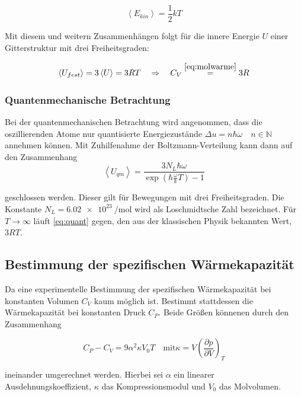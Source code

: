 \begin{equation*}
\left< E_{kin} \right>=\frac{1}{2}kT
\end{equation*} 

Mit diesem und weitern Zusammenhängen folgt für die innere Energie $U$ 
einer Gitterstruktur mit drei Freiheitsgraden:

\begin{equation*}
\left< U_{fest} \right> = 3 \left< U \right>=3RT \quad \Rightarrow \quad C_{V}\overset{\eqref{eq:molwarme}}{=}3R
\end{equation*}

\subsubsection{Quantenmechanische Betrachtung}
Bei der quantenmechanischen Betrachtung wird angenommen, 
dass die oszillierenden Atome nur quantisierte Energiezustände $\Delta u=n\hbar \omega \quad n\in\mathbb{N}$
annehmen können.
Mit Zuhilfenahme der Boltzmann-Verteilung kann dann auf den Zusammenhang 
\begin{equation}
\label{eq:quant}
\left< U_{qm} \right> =\frac{3N_L \hbar \omega}{\exp\left(\hbar \frac{\omega}{k} T\right) -1}
\end{equation}

geschlossen werden. Dieser gilt für Bewegungen mit drei Freiheitsgraden.
Die Konstante $N_L = \SI{6.02e23}{\per\mol}$ wird als Loschmidtsche Zahl bezeichnet.
Für $T\to\infty$ läuft \eqref{eq:quant} gegen, den aus der klassischen Physik bekannten Wert, 
$3RT$.

\subsection{Bestimmung der spezifischen Wärmekapazität}
Da eine experimentelle Bestimmung der spezifischen Wärmekapazität 
bei konstanten Volumen $C_V$ kaum möglich ist.
Bestimmt stattdessen die Wärmekapazität bei konstanten Druck $C_P$.
Beide Größen könnenen durch den Zusammenhang

\begin{equation}
\label{eq:umrechnung_cp_cv}
C_P-C_V=9\alpha^2\kappa V_0 T \quad \text{mit} \kappa=V\left(\frac{\partial p}{\partial V}\right)_T
\end{equation}

ineinander umgerechnet werden.
Hierbei sei $\alpha$ ein linearer Ausdehnungskoeffizient, $\kappa$ das Kompressionsmodul und
$V_0$ das Molvolumen.

